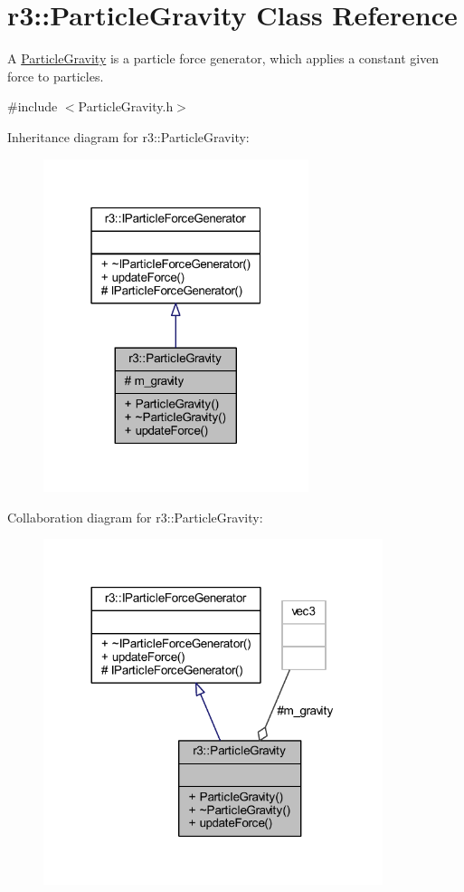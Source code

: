 \hypertarget{classr3_1_1_particle_gravity}{}\section{r3\+:\+:Particle\+Gravity Class Reference}
\label{classr3_1_1_particle_gravity}


A \mbox{\hyperlink{classr3_1_1_particle_gravity}{Particle\+Gravity}} is a particle force generator, which applies a constant given force to particles.  




{\ttfamily \#include $<$Particle\+Gravity.\+h$>$}



Inheritance diagram for r3\+:\+:Particle\+Gravity\+:\nopagebreak
\begin{figure}[H]
\begin{center}
\leavevmode
\includegraphics[width=220pt]{classr3_1_1_particle_gravity__inherit__graph}
\end{center}
\end{figure}


Collaboration diagram for r3\+:\+:Particle\+Gravity\+:\nopagebreak
\begin{figure}[H]
\begin{center}
\leavevmode
\includegraphics[width=281pt]{classr3_1_1_particle_gravity__coll__graph}
\end{center}
\end{figure}
